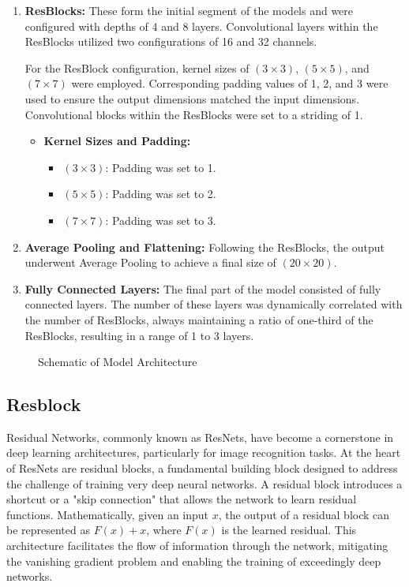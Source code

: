 \documentclass[]{report}
\begin{document}
\begin{enumerate}
    \item \textbf{ResBlocks:} These form the initial segment of the models and were configured with depths of 4 and 8 layers. Convolutional layers within the ResBlocks utilized two configurations of 16 and 32 channels.

    For the ResBlock configuration, kernel sizes of $(3 \times 3)$, $(5 \times 5)$, and $(7 \times 7)$ were employed. Corresponding padding values of 1, 2, and 3 were used to ensure the output dimensions matched the input dimensions. Convolutional blocks within the ResBlocks were set to a striding of 1.
    \begin{itemize}
        \item \textbf{Kernel Sizes and Padding:}
        \begin{itemize}
            \item $(3\times 3)$: Padding was set to 1.
            \item $(5\times 5)$: Padding was set to 2.
            \item $(7\times 7)$: Padding was set to 3.
        \end{itemize}
    \end{itemize}
    \item \textbf{Average Pooling and Flattening:} Following the ResBlocks, the output underwent Average Pooling to achieve a final size of $(20 \times 20)$.
    
    \item \textbf{Fully Connected Layers:} The final part of the model consisted of fully connected layers. The number of these layers was dynamically correlated with the number of ResBlocks, always maintaining a ratio of one-third of the ResBlocks, resulting in a range of 1 to 3 layers.
\end{enumerate}


\begin{figure}[h]
    \centering
    
    \caption{Schematic of Model Architecture}
    \label{fig:resblock}
\end{figure}

\subsection{Resblock}
Residual Networks, commonly known as ResNets, have become a cornerstone in deep learning architectures, particularly for image recognition tasks. At the heart of ResNets are residual blocks, a fundamental building block designed to address the challenge of training very deep neural networks\cite{he2016deep}. A residual block introduces a shortcut or a "skip connection" that allows the network to learn residual functions. Mathematically, given an input $x$, the output of a residual block can be represented as $F(x) + x$, where $F(x)$ is the learned residual. This architecture facilitates the flow of information through the network, mitigating the vanishing gradient problem and enabling the training of exceedingly deep networks. 
\end{document}

